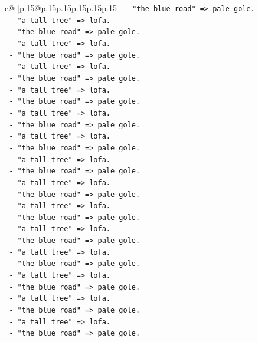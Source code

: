 \documentclass{article}
\begin{document}
{\begin{supertabular}{c@{$\;$}|p{.15\linewidth}@{}p{.15\linewidth}p{.15\linewidth}p{.15\linewidth}p{.15\linewidth}p{.15\linewidth}}
{{{\texttt{         {-} "the blue road" => pale gole.} \\
\texttt{         {-} "a tall tree" => lofa.} \\
\texttt{         {-} "the blue road" => pale gole.} \\
\texttt{         {-} "a tall tree" => lofa.} \\
\texttt{         {-} "the blue road" => pale gole.} \\
\texttt{         {-} "a tall tree" => lofa.} \\
\texttt{         {-} "the blue road" => pale gole.} \\
\texttt{         {-} "a tall tree" => lofa.} \\
\texttt{         {-} "the blue road" => pale gole.} \\
\texttt{         {-} "a tall tree" => lofa.} \\
\texttt{         {-} "the blue road" => pale gole.} \\
\texttt{         {-} "a tall tree" => lofa.} \\
\texttt{         {-} "the blue road" => pale gole.} \\
\texttt{         {-} "a tall tree" => lofa.} \\
\texttt{         {-} "the blue road" => pale gole.} \\
\texttt{         {-} "a tall tree" => lofa.} \\
\texttt{         {-} "the blue road" => pale gole.} \\
\texttt{         {-} "a tall tree" => lofa.} \\
\texttt{         {-} "the blue road" => pale gole.} \\
\texttt{         {-} "a tall tree" => lofa.} \\
\texttt{         {-} "the blue road" => pale gole.} \\
\texttt{         {-} "a tall tree" => lofa.} \\
\texttt{         {-} "the blue road" => pale gole.} \\
\texttt{         {-} "a tall tree" => lofa.} \\
\texttt{         {-} "the blue road" => pale gole.} \\
\texttt{         {-} "a tall tree" => lofa.} \\
\texttt{         {-} "the blue road" => pale gole.} \\
\texttt{         {-} "a tall tree" => lofa.} \\
\texttt{         {-} "the blue road" => pale gole.} \\
}}}
\end{supertabular}}
\end{document}
